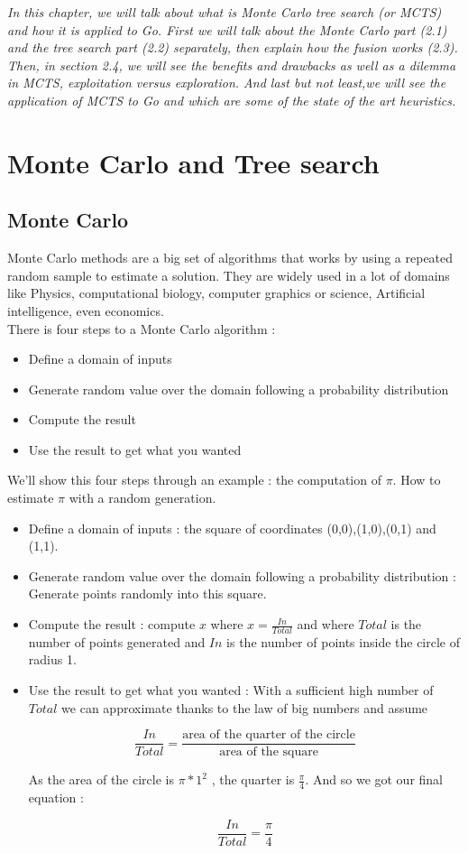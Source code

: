 
\textit{In this chapter, we will talk about what is Monte Carlo tree search (or MCTS) and how it is applied to Go.
First we will talk about the Monte Carlo part (2.1) and the tree search part (2.2) separately, then explain how the fusion works (2.3).
Then, in section 2.4, we will see the benefits and drawbacks as well as a dilemma in MCTS, exploitation versus exploration. 
And last but not least,we will see the application of MCTS to Go and which are some of the state of the art heuristics. }

\section{Monte Carlo and Tree search}

\subsection{Monte Carlo}

Monte Carlo methods are a big set of algorithms that works by using a repeated random sample to estimate a solution. They are widely used in a lot of domains like Physics, computational biology, computer graphics or science, Artificial intelligence, even economics. 
\\

There is four steps to a Monte Carlo algorithm : 

\begin{itemize}
\item Define a domain of inputs
\item Generate random value over the domain following a probability distribution
\item Compute the result
\item Use the result to get what you wanted
\end{itemize} 

We'll show this four steps through an example : the computation of $\pi$. How to estimate $\pi$ with a random generation. 

\begin{itemize}
\item Define a domain of inputs : the square of coordinates (0,0),(1,0),(0,1) and (1,1).
\item Generate random value over the domain following a probability distribution : Generate points randomly into this square. 
\item Compute the result : compute $x$ where $x = \frac{In}{Total}$ and where $Total$ is the number of points generated and $In$ is the number of points inside the circle of radius 1. 
\item Use the result to get what you wanted : With a sufficient high number of $Total$ we can approximate thanks to the law of big numbers and assume


$$\frac{In}{Total}= \frac{\textrm{area of the quarter of the circle}}{\textrm{area of the square}}$$

 As the area of the circle is $ \pi*1^2$ , the quarter is $\frac{\pi}{4}$. And so we got our final equation : 

$$
\frac{In}{Total}=\frac{\pi}{4}
$$
\end{itemize} 


